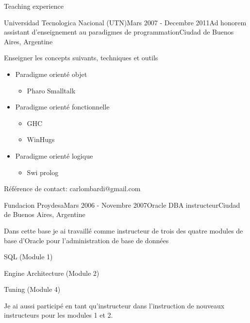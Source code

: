 \documentclass{resume} %
\begin{document}
\begin{rSection}{Teaching experience}
\begin{rSubsection}{Universidad Tecnologica Nacional (UTN)}{Mars 2007 - Decembre 2011}{Ad honorem assistant d'enseignement au paradigmes de programmation}{Ciudad de Buenos Aires, Argentine}
\item Enseigner les concepts suivants, techniques et outils
\begin{itemize}
	\item Paradigme orient\'{e} objet
	\begin{itemize}
		\item Pharo Smalltalk
	\end{itemize}
	\item Paradigme orient\'{e} fonctionnelle
	\begin{itemize}
		\item GHC
		\item WinHugs
	\end{itemize}
	\item Paradigme orient\'{e} logique
	\begin{itemize}
		\item  Swi prolog
	\end{itemize}
\end{itemize}
\item R\'{e}f\'{e}rence de contact: carlombardi@gmail.com
\end{rSubsection}


\begin{rSubsection}{Fundacion Proydesa}{Mars 2006 - Novembre 2007}{Oracle DBA instructeur}{Ciudad de Buenos Aires, Argentine}
	\item Dans cette base je ai travaill\'{e} comme instructeur de trois des quatre modules de base d'Oracle pour l'administration de base de donn\'{e}es
	\item SQL (Module 1)
	\item Engine Architecture (Module 2)
	\item Tuning (Module 4)
	\item Je ai aussi particip\'{e} en tant qu'instructeur dans l'instruction de nouveaux instructeurs pour les modules 1 et 2.
\end{rSubsection}


\end{rSection}



\end{document}
